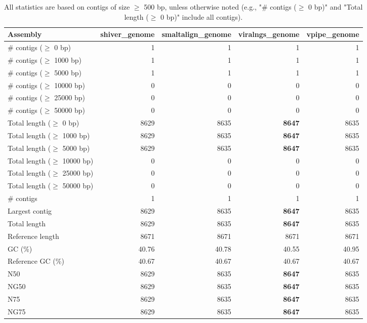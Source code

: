 \documentclass[12pt,a4paper]{article}
\begin{document}
\begin{table}[ht]
\begin{center}
\caption{All statistics are based on contigs of size $\geq$ 500 bp, unless otherwise noted (e.g., "\# contigs ($\geq$ 0 bp)" and "Total length ($\geq$ 0 bp)" include all contigs).}
\begin{tabular}{|l*{4}{|r}|}
\hline
Assembly & shiver\_genome & smaltalign\_genome & viralngs\_genome & vpipe\_genome \\ \hline
\# contigs ($\geq$ 0 bp) & 1 & 1 & 1 & 1 \\ \hline
\# contigs ($\geq$ 1000 bp) & 1 & 1 & 1 & 1 \\ \hline
\# contigs ($\geq$ 5000 bp) & 1 & 1 & 1 & 1 \\ \hline
\# contigs ($\geq$ 10000 bp) & 0 & 0 & 0 & 0 \\ \hline
\# contigs ($\geq$ 25000 bp) & 0 & 0 & 0 & 0 \\ \hline
\# contigs ($\geq$ 50000 bp) & 0 & 0 & 0 & 0 \\ \hline
Total length ($\geq$ 0 bp) & 8629 & 8635 & {\bf 8647} & 8635 \\ \hline
Total length ($\geq$ 1000 bp) & 8629 & 8635 & {\bf 8647} & 8635 \\ \hline
Total length ($\geq$ 5000 bp) & 8629 & 8635 & {\bf 8647} & 8635 \\ \hline
Total length ($\geq$ 10000 bp) & 0 & 0 & 0 & 0 \\ \hline
Total length ($\geq$ 25000 bp) & 0 & 0 & 0 & 0 \\ \hline
Total length ($\geq$ 50000 bp) & 0 & 0 & 0 & 0 \\ \hline
\# contigs & 1 & 1 & 1 & 1 \\ \hline
Largest contig & 8629 & 8635 & {\bf 8647} & 8635 \\ \hline
Total length & 8629 & 8635 & {\bf 8647} & 8635 \\ \hline
Reference length & 8671 & 8671 & 8671 & 8671 \\ \hline
GC (\%) & 40.76 & 40.78 & 40.55 & 40.95 \\ \hline
Reference GC (\%) & 40.67 & 40.67 & 40.67 & 40.67 \\ \hline
N50 & 8629 & 8635 & {\bf 8647} & 8635 \\ \hline
NG50 & 8629 & 8635 & {\bf 8647} & 8635 \\ \hline
N75 & 8629 & 8635 & {\bf 8647} & 8635 \\ \hline
NG75 & 8629 & 8635 & {\bf 8647} & 8635 \\ \hline

\end{tabular}
\end{center}
\end{table}
\end{document}
